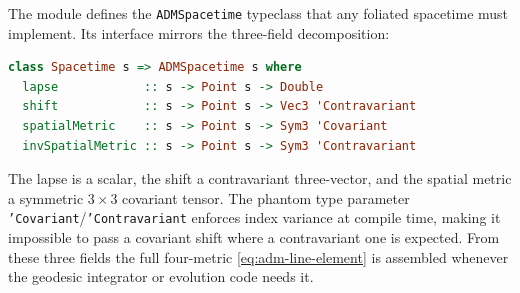 The  module defines the
\texttt{ADMSpacetime} typeclass that any foliated spacetime must
implement.  Its interface mirrors the three-field decomposition:
%
\begin{lstlisting}[language=Haskell]
class Spacetime s => ADMSpacetime s where
  lapse            :: s -> Point s -> Double
  shift            :: s -> Point s -> Vec3 'Contravariant
  spatialMetric    :: s -> Point s -> Sym3 'Covariant
  invSpatialMetric :: s -> Point s -> Sym3 'Contravariant
\end{lstlisting}
%
The lapse is a scalar, the shift a contravariant three-vector, and the
spatial metric a symmetric $3 \times 3$ covariant tensor.  The phantom
type parameter \texttt{'Covariant}/\texttt{'Contravariant} enforces
index variance at compile time, making it impossible to pass a covariant
shift where a contravariant one is expected.  From these three fields the
full four-metric \cref{eq:adm-line-element} is assembled whenever the
geodesic integrator or evolution code needs it.
